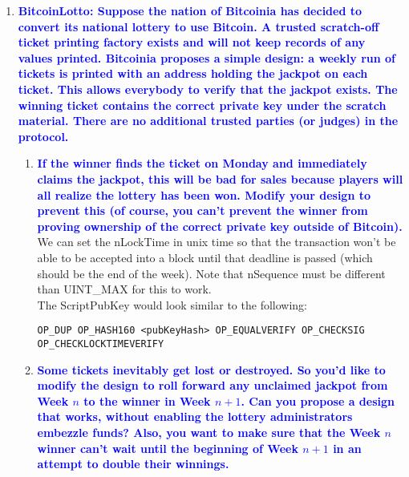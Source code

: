 \documentclass[11pt]{article}
\begin{document}
\begin{enumerate}
\item \textbf{\textcolor{blue}{BitcoinLotto: Suppose the nation of Bitcoinia has decided to convert its national lottery to use Bitcoin. A trusted scratch-off ticket printing factory exists and will not keep records of any values printed. Bitcoinia proposes a simple design: a weekly run of tickets is printed with an address holding the jackpot on each ticket. This allows everybody to verify that the jackpot exists. The winning ticket contains the correct private key under the scratch material. There are no additional trusted parties (or judges) in the protocol.}}
    \begin{enumerate}
    \item \textbf{\textcolor{blue}{If the winner finds the ticket on Monday and immediately claims the jackpot, this will be bad for sales because players will all realize the lottery has been won. Modify your design to prevent this (of course, you can’t prevent the winner from proving ownership of the correct private key outside of Bitcoin).}}
        \\ We can set the nLockTime in unix time so that the transaction won't be able to be accepted into a block until that deadline is passed (which should be the end of the week). Note that nSequence must be different than UINT\_MAX for this to work.
        \\ The ScriptPubKey would look similar to the following:
        \begin{verbatim}
OP_DUP OP_HASH160 <pubKeyHash> OP_EQUALVERIFY OP_CHECKSIG OP_CHECKLOCKTIMEVERIFY
        \end{verbatim}
        
    \item \textbf{\textcolor{blue}{Some tickets inevitably get lost or destroyed. So you’d like to modify the design to roll forward any unclaimed jackpot from Week $n$ to the winner in Week $n+1$. Can you propose a design that works, without enabling the lottery administrators embezzle funds? Also, you want to make sure that the Week $n$ winner can’t wait until the beginning of Week $n+1$ in an attempt to double their winnings.}}
    \end{enumerate}

\end{enumerate}
\end{document}
